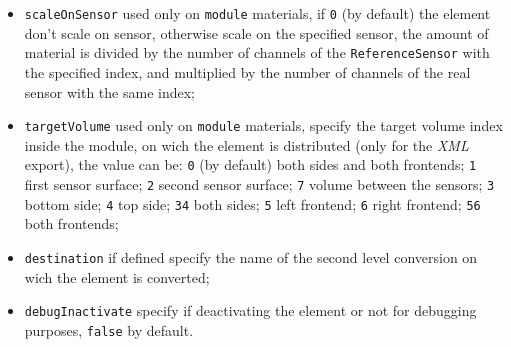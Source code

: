 \documentclass[12pt, a4paper]{article}
\newcommand{\prop}[1]{\texttt{#1}}
\begin{document}
\begin{itemize}
\begin{itemize}
\begin{itemize}
    \item \prop{scaleOnSensor} used only on \prop{module} materials,
      if \prop{0} (by default) the element don't scale on sensor,
      otherwise scale on the specified sensor, the amount of material
      is divided by the number of channels of the
      \prop{ReferenceSensor} with the specified index, and multiplied
      by the number of channels of the real sensor with the same
      index;
    \item \prop{targetVolume} used only on \prop{module} materials,
      specify the target volume index inside the module, on wich the
      element is distributed (only for the \emph{XML} export), the value can
      be: \prop{0} (by default) both sides and both frontends;
      \prop{1} first sensor surface; \prop{2} second sensor surface;
      \prop{7} volume between the sensors; \prop{3} bottom side;
      \prop{4} top side; \prop{34} both sides; \prop{5} left frontend;
      \prop{6} right frontend; \prop{56} both frontends;
    \item \prop{destination} if defined specify the name of the second
      level conversion on wich the element is converted;
    \item \prop{debugInactivate} specify if deactivating the element
      or not for debugging purposes, \prop{false} by default.
    \end{itemize}
  \end{itemize}
\end{itemize}
\end{document}
